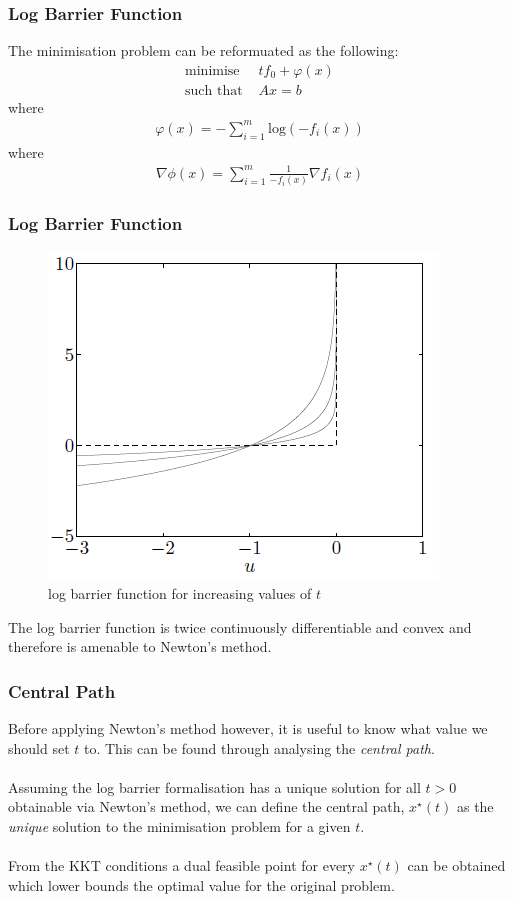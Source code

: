 \documentclass{beamer}
\begin{document}
\begin{frame}
    \frametitle{Log Barrier Function}
    The minimisation problem can be reformuated as the following:
    \begin{align*}
        \text{minimise } \, &t f_{0} +
        \varphi(x)\\
        \text{such that } & Ax =b
    \end{align*}
    where
    \begin{align*}
        \varphi(x) = - \sum\limits_{i=1}^{m}\text{log}(-f_{i}(x))
    \end{align*}
    where
    \begin{align*}
        \nabla \phi(x) = \sum\limits_{i=1}^{m}\frac{1}{-f_{i}(x)}\nabla f_{i}(x)
    \end{align*}
\end{frame}

\begin{frame}
    \frametitle{Log Barrier Function}
    \begin{figure}[t]
        \centering
        \includegraphics[scale=0.6]{barrier_function}
        \caption{log barrier function for increasing values of $t$}
        \label{fig:logbar}
    \end{figure}
    The log barrier function is twice continuously differentiable and convex
    and therefore is amenable to Newton's method.
\end{frame}


\begin{frame}
    \frametitle{Central Path}
    Before applying Newton's method however, it is useful to know what value we
    should set $t$ to. This can be found through analysing the \textit{central
    path}.
    \\~\\
    Assuming the log barrier formalisation has a unique solution for all
    $t > 0$ obtainable via Newton's method, we can define the central path,
    $x^{\star}(t)$ as the \textit{unique} solution to the minimisation problem for a given
    $t$.
    \\~\\
    From the KKT conditions a dual feasible point for every
    $x^{\star}(t)$ can be obtained which lower bounds the optimal value for
    the original problem.
\end{frame}
\end{document}
